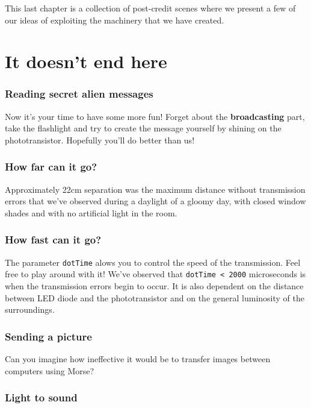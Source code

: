 \documentclass[12pt]{report}
\begin{document}
This last chapter is a collection of post-credit scenes where we present a few of our ideas of exploiting the machinery that we have created.

\section{It doesn't end here}



\subsubsection{Reading secret alien messages}

Now it's your time to have some more fun! Forget about the \textbf{broadcasting} part, take the flashlight and try to create the message yourself by shining on the phototransistor. Hopefully you'll do better than us!


\subsubsection{How far can it go?}

Approximately 22cm separation was the maximum distance without transmission errors that we've observed during a daylight of a gloomy day, with closed window shades and with no artificial light in the room. 


\subsubsection{How fast can it go?}

The parameter \verb|dotTime| alows you to control the speed of the transmission. Feel free to play around with it! We've observed that \verb|dotTime < 2000| microseconds is when the transmission errors begin to occur. It is also dependent on the distance between LED diode and the phototransistor and on the general luminosity of the surroundings.

\subsubsection{Sending a picture}

Can you imagine how ineffective it would be to transfer images between computers using Morse?

\subsubsection{Light to sound}
\end{document}
